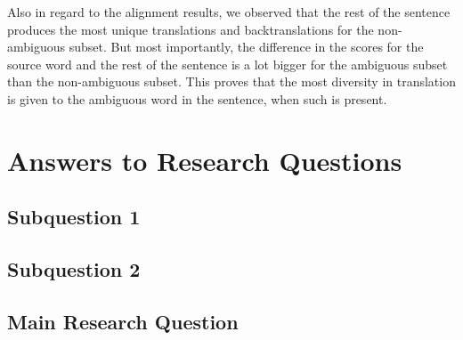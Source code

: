 Also in regard to the alignment results, we observed that the rest of the sentence produces the most unique translations and backtranslations for the non-ambiguous subset. But most importantly, the difference in the scores for the source word and the rest of the sentence is a lot bigger for the ambiguous subset than the non-ambiguous subset. This proves that the most diversity in translation is given to the ambiguous word in the sentence, when such is present.







\section{Answers to Research Questions}
\label{sec:Discussion:Answers}

\subsection{Subquestion 1} %
\label{sec:Discussion:Answers:1}

\subsection{Subquestion 2} %
\label{sec:Discussion:Answers:2}

\subsection{Main Research Question} %
\label{sec:Discussion:Answers:Main}


